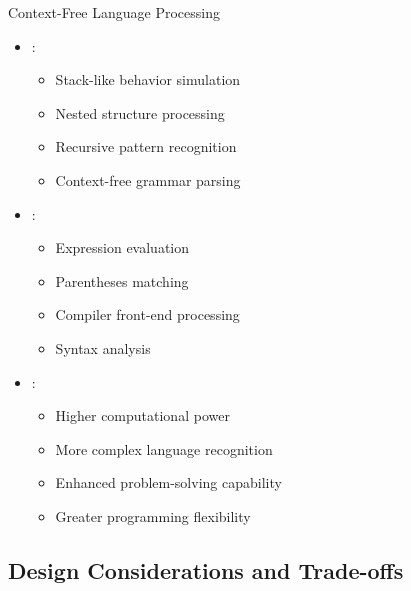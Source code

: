 \begin{frame}{Context-Free Language Processing}
\begin{itemize}
\item {}:
\begin{itemize}
\item Stack-like behavior simulation
\item Nested structure processing
\item Recursive pattern recognition
\item Context-free grammar parsing
\end{itemize}
\vspace{0.5cm}
\item {}:
\begin{itemize}
\item Expression evaluation
\item Parentheses matching
\item Compiler front-end processing
\item Syntax analysis
\end{itemize}
\vspace{0.3cm}
\item {}:
\begin{itemize}
\item Higher computational power
\item More complex language recognition
\item Enhanced problem-solving capability
\item Greater programming flexibility
\end{itemize}
\end{itemize}
\end{frame}

\subsection{Design Considerations and Trade-offs}


